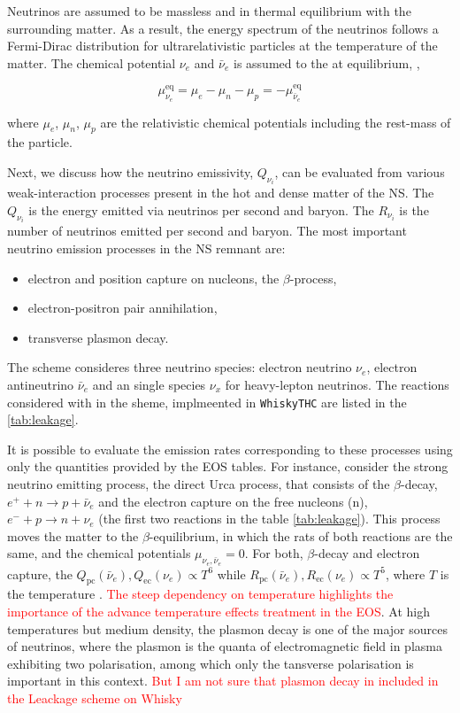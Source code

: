 \documentclass[11pt,a4paper,headinclude=true,DIV=14,BCOR=8mm,chapterprefix,listof=totoc,twoside,openright,abstracton]{scrbook}
\newcommand{\red}[1]{\textcolor{red}{#1}}
\begin{document}
Neutrinos are assumed to be massless and in thermal equilibrium with the surrounding matter.
As a result, the energy spectrum of the neutrinos follows a Fermi-Dirac distribution for
ultrarelativistic particles at the temperature of the matter. 
The chemical potential $\nu_e$ and $\bar{\nu}_e$ is assumed to the at equilibrium, \cite{Rosswog:2003rv},

\begin{equation}
    \mu_{\nu_e}^{\text{eq}} = \mu_e - \mu_n - \mu_p = -\mu_{\bar{\nu}_e}^{\text{eq}}
\end{equation}

where $\mu_e$, $\mu_n$, $\mu_p$ are the relativistic chemical potentials including the rest-mass of the particle. 

Next, we discuss how the neutrino emissivity, $Q_{\nu_{i}}$, can be evaluated from various weak-interaction processes present in the hot and dense matter of the NS. 
The $Q_{\nu_{i}}$ is the energy emitted via neutrinos per second and baryon.
The $R_{\nu_{i}}$ is the number of neutrinos emitted per second and baryon.
The most important neutrino emission processes in the NS remnant are: 
\begin{itemize}
    \item electron and position capture on nucleons, the $\beta$-process,
    \item electron-positron pair annihilation, 
    \item transverse plasmon decay.
\end{itemize}
The scheme consideres three neutrino species: electron neutrino $\nu_e$, electron antineutrino $\bar{\nu}_e$ and an single species $\nu_x$ for heavy-lepton neutrinos.
The reactions considered with in the sheme, implmeented in \texttt{WhiskyTHC} are  listed in the \ref{tab:leakage}.

It is possible to evaluate the emission rates corresponding to these processes using only the quantities provided by the EOS tables.
For instance, consider the strong neutrino emitting process, the direct Urca process, that consists of the $\beta$-decay, $e^+ + n \rightarrow p + \bar{\nu}_e$ and the electron capture on the free nucleons (n), $e^{-} + p \rightarrow n + \nu_e$ (the first two reactions in the table \ref{tab:leakage}). 
This process moves the matter to the $\beta$-equilibrium, in which the rats of both reactions are the same, and the chemical potentials $\mu_{\nu_e,\bar{\nu}_e}=0$.
For both, $\beta$-decay and electron capture, the $Q_{\text{pc}}(\bar{\nu}_e),Q_{\text{ec}}({\nu_e}) \propto T^{6}$ while $R_{\text{pc}}(\bar{\nu}_e),R_{\text{ec}}(\nu_e)\propto T^5$, where $T$ is the temperature \cite{Bruenn:1985}.
\red{The steep dependency on temperature highlights the importance of the advance temperature effects treatment in the EOS}.
At high temperatures but medium density, the plasmon decay is one of the major sources of neutrinos, where the plasmon is the quanta of electromagnetic field in plasma exhibiting two polarisation, among which only the tansverse polarisation is important in this context.
\cite{P. J. Schinder, D. N. Schramm, P. J.Wiita, S. H. Margolis, and D. L. Tubbs, Astrophys. J. 313, 531 (1987).} 
\red{But I am not sure that plasmon decay in included in the Leackage scheme on Whisky}
\end{document}
